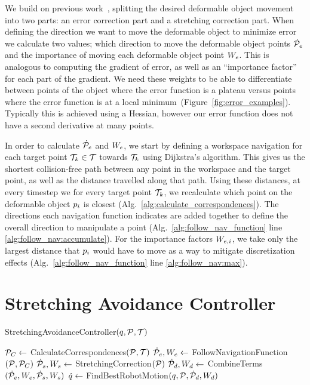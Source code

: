 We build on previous work~\cite{Berenson2013}, splitting the desired deformable object movement into two parts: an error correction part and a stretching correction part. When defining the direction we want to move the deformable object to minimize error we calculate two values; which direction to move the deformable object points $\dot{\mathcal{P}}_e$ and the importance of moving each deformable object point $W_e$. This is analogous to computing the gradient of error, as well as an ``importance factor'' for each part of the gradient. We need these weights to be able to differentiate between points of the object where the error function is a plateau versus points where the error function is at a local minimum~(Figure~\ref{fig:error_examples}). Typically this is achieved using a Hessian, however our error function does not have a second derivative at many points. 

In order to calculate $\dot{\mathcal{P}}_e$ and $W_e$, we start by defining a workspace navigation for each target point $\mathcal{T}_k \in \mathcal{T}$ towards $\mathcal{T}_k$ using Dijkstra's algorithm. This gives us the shortest collision-free path between any point in the workspace and the target point, as well as the distance travelled along that path. Using these distances, at every timestep we for every target point $\mathcal{T}_k$, we recalculate which point on the deformable object $p_i$ is closest (Alg.~\ref{alg:calculate_correspondences}). The directions each navigation function indicates are added together to define the overall direction to manipulate a point (Alg.~\ref{alg:follow_nav_function} line \ref{alg:follow_nav:accumulate}). For the importance factors $W_{e,i}$, we take only the largest distance that $p_i$ would have to move as a way to mitigate discretization effects (Alg.~\ref{alg:follow_nav_function} line \ref{alg:follow_nav:max}).


\section{Stretching Avoidance Controller}
\label{sec:stretching_avoidance_controller}

\begin{algorithm}[ht]
    \caption{StretchingAvoidanceController$(q, \mathcal{P}, \mathcal{T})$}
    \begin{algorithmic}[1]
        \State $\mathcal{P}_C \gets$ CalculateCorrespondences$(\mathcal{P}, \mathcal{T})$
        \State $\dot{\mathcal{P}}_e, W_e \gets$ FollowNavigationFunction$(\mathcal{P}, \mathcal{P}_C)$
        \State $\dot{\mathcal{P}}_s, W_s \gets$ StretchingCorrection$(\mathcal{P})$
        \State $\dot{\mathcal{P}}_d, W_d \gets$ CombineTerms$(\dot{\mathcal{P}}_e, W_e, \dot{\mathcal{P}}_s, W_s)$
        \State $\dot{q} \gets$ FindBestRobotMotion$(q, \mathcal{P}, \dot{\mathcal{P}}_d, W_d)$
    \end{algorithmic}
    \label{alg:stretching_avoidance_controller}
\end{algorithm}

